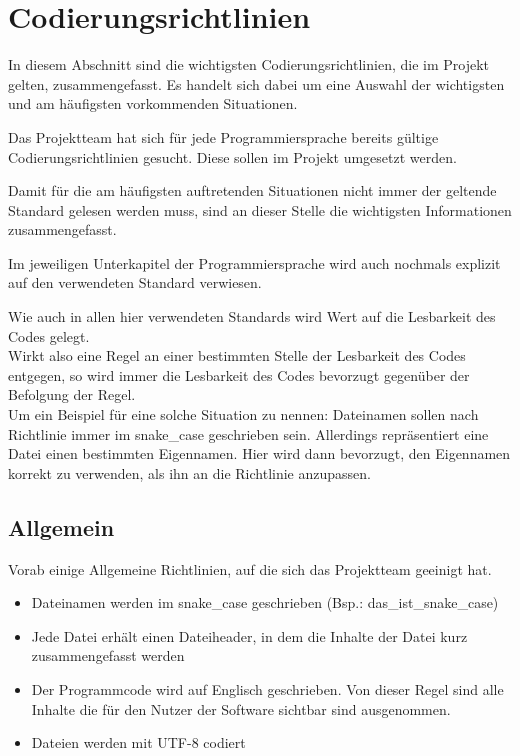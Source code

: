 
\chapter{Codierungsrichtlinien}\label{sec:Chap2}
In diesem Abschnitt sind die wichtigsten Codierungsrichtlinien, die im Projekt gelten, zusammengefasst. Es handelt sich dabei um eine Auswahl der wichtigsten und am häufigsten vorkommenden Situationen.

Das Projektteam hat sich für jede Programmiersprache bereits gültige Codierungsrichtlinien gesucht. Diese sollen im Projekt umgesetzt werden. 

Damit für die am häufigsten auftretenden Situationen nicht immer der geltende Standard gelesen werden muss, sind an dieser Stelle die wichtigsten Informationen zusammengefasst. 

Im jeweiligen Unterkapitel der Programmiersprache wird auch nochmals explizit auf den verwendeten Standard verwiesen.

Wie auch in allen hier verwendeten Standards wird Wert auf die Lesbarkeit des Codes gelegt.\\
Wirkt also eine Regel an einer bestimmten Stelle der Lesbarkeit des Codes entgegen, so wird immer die Lesbarkeit des Codes bevorzugt gegenüber der Befolgung der Regel.\\
Um ein Beispiel für eine solche Situation zu nennen:
Dateinamen sollen nach Richtlinie immer im snake\_case geschrieben sein. Allerdings repräsentiert eine Datei einen bestimmten Eigennamen. Hier wird dann bevorzugt, den Eigennamen korrekt zu verwenden, als ihn an die Richtlinie anzupassen.
\section{Allgemein}
Vorab einige Allgemeine Richtlinien, auf die sich das Projektteam geeinigt hat.
\begin{itemize}
\item Dateinamen werden im snake\_case geschrieben (Bsp.: das\_ist\_snake\_case)
\item Jede Datei erhält einen Dateiheader, in dem die Inhalte der Datei kurz zusammengefasst werden
\item Der Programmcode wird auf Englisch geschrieben. Von dieser Regel sind alle Inhalte die für den Nutzer der Software sichtbar sind ausgenommen.
\item Dateien werden mit UTF-8 codiert
\end{itemize}

